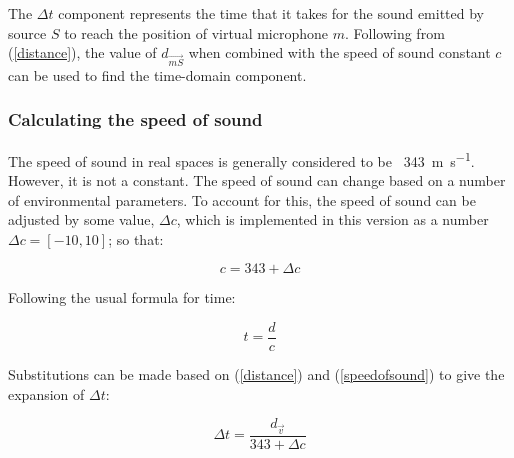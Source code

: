 The $\Delta{}t$ component represents the time that it takes for the sound emitted by source $S$ to reach the position of virtual microphone $m$. Following from (\ref{distance}), the value of $d_{\vec{mS}}$ when combined with the speed of sound constant $c$ can be used to find the time-domain component.

\subsubsection{Calculating the speed of sound}

The speed of sound in real spaces is generally considered to be ~\SI[per-mode=fraction]{343}{\m\per\s}. However, it is not a constant. The speed of sound can change based on a number of environmental parameters. To account for this, the speed of sound can be adjusted by some value, $\Delta{}c$, which is implemented in this version as a number $\Delta{}c = [-10, 10]$; so that:

\begin{equation}\label{speedofsound}
c = 343 + \Delta{}c
\end{equation}

Following the usual formula for time:

\begin{equation}\label{timeFormula}
t = \frac{d}{c}
\end{equation}

Substitutions can be made based on (\ref{distance}) and (\ref{speedofsound}) to give the expansion of $\Delta{}t$:

\begin{equation}\label{deltat}
\Delta{}t = \frac{d_{\vec{v}}}{343 + \Delta{}c}
\end{equation}
